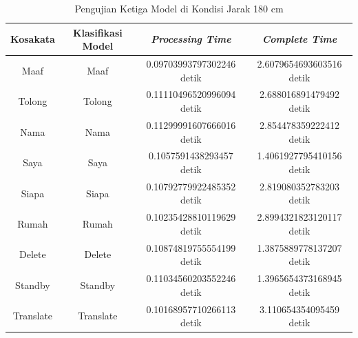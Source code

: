\newpage
\begin{longtable}{|c|c|c|c|}
  \caption{Pengujian Ketiga Model di Kondisi Jarak 180 cm}
  \label{tb:prediksipendek3}                                   \\
  \hline
  \rowcolor[HTML]{C0C0C0}
  \textbf{Kosakata} & \textbf{Klasifikasi Model} & \textbf{\emph{Processing Time}} & \textbf{\emph{Complete Time}}\\
  \hline
  Maaf              & Maaf                          & 0.09703993797302246 detik                          & 2.6079654693603516 detik                                  \\
  Tolong            & Tolong                        & 0.11110496520996094 detik                          & 2.688016891479492 detik                                \\
  Nama              & Nama                          & 0.11299991607666016 detik                          & 2.854478359222412 detik                                \\
  Saya              & Saya                          & 0.1057591438293457 detik                           & 1.4061927795410156 detik                                 \\
  Siapa             & Siapa                         & 0.10792779922485352 detik                          & 2.819080352783203 detik                                \\
  Rumah             & Rumah                         & 0.10235428810119629 detik                          & 2.8994321823120117 detik                                 \\
  Delete            & Delete                        & 0.10874819755554199 detik                          & 1.3875889778137207 detik                                 \\
  Standby           & Standby                       & 0.11034560203552246 detik                          & 1.3965654373168945 detik                                 \\
  Translate         & Translate                     & 0.10168957710266113 detik                          & 3.110654354095459 detik                                \\
  \hline
\end{longtable}

